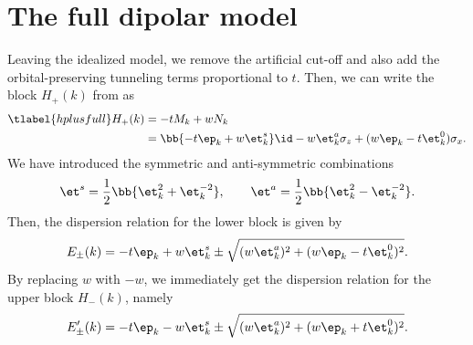 \section{The full dipolar model}
Leaving the idealized model, we remove the artificial cut-off and also add the orbital-preserving tunneling terms proportional to $t$.
Then, we can write the block $H_+(k)$ from  as
\begin{align} \tlabel{hplusfull}
    H_+(k) &= -t M_k + w N_k \\
           &= \bb{-t \ep_k + w \et^{s}_k} \id - w\et^{a}_k \sigma_z + (w \ep_k - t \et^0_k) \sigma_x.
\end{align}
We have introduced the symmetric and anti-symmetric combinations
\begin{align}
    \et^s = \frac{1}{2} \bb{ \et^2_k + \et^{-2}_{k} }, \qquad
    \et^a = \frac{1}{2} \bb{ \et^2_k - \et^{-2}_{k} }.
\end{align}
Then, the dispersion relation for the lower block is given by
\begin{align}
    E_\pm(k) = -t \ep_k + w \et^s_k \pm \sqrt{(w \et^a_k)^2+(w \ep_k - t \et^0_k)^2}.
\end{align}
By replacing $w$ with $-w$, we immediately get the dispersion relation for the upper block $H_-(k)$, namely
\begin{align}
    E'_\pm(k) = -t \ep_k - w \et^s_k \pm \sqrt{(w \et^a_k)^2+(w \ep_k + t \et^0_k)^2}.
\end{align}


